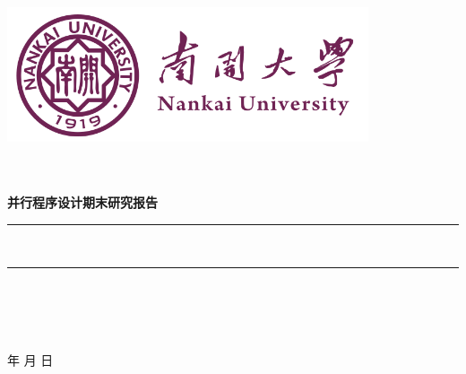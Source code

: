 \documentclass[a4paper]{article}
\newcommand{\HRule}{\rule{\linewidth}{0.5mm}}%
\begin{document}
\renewcommand{\contentsname}{目\ 录}
\renewcommand{\appendixname}{附录}
\renewcommand{\appendixpagename}{附录}
\renewcommand{\refname}{参考文献}
\renewcommand{\figurename}{图}
\renewcommand{\tablename}{表}
\renewcommand{\today}{\number\year 年 \number\month 月 \number\day 日}

\begin{titlepage}
  \begin{center}
    \includegraphics[width=0.8\textwidth]{NKU.png}\\[1cm]
    \vspace{20mm}
    \textbf{\huge\textbf{}}\\[0.5cm]
    \textbf{\huge{}}\\[2.3cm]
    \textbf{\Huge\textbf{}}

    \vspace{\fill}

    \textbf{\Large \textbf{并行程序设计期末研究报告}}\\[0.8cm]
    \HRule \\[0.9cm]
    \HRule \\[2.0cm]
    \centering
    \textsc{\LARGE {}}\\[0.5cm]
    \textsc{\LARGE {}}\\[0.5cm]
    \textsc{\LARGE {}}\\[0.5cm]

    \vfill
    {\Large \today}
  \end{center}
\end{titlepage}

\renewcommand {\thefigure}{\thesection{}.\arabic{figure}}%
\renewcommand{\figurename}{图}
\renewcommand{\contentsname}{目录}


\clearpage
\tableofcontents
\newpage
\end{document}
